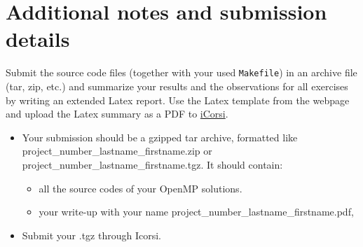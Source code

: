 \documentclass[unicode,11pt,a4paper,oneside,numbers=endperiod,openany]{scrartcl}
\begin{document}
\section*{Additional notes and submission details}
Submit the source code files (together with your used \texttt{Makefile}) in
an archive file (tar, zip, etc.) and summarize your results and the
observations for all exercises by writing an extended Latex report.
Use the Latex template from the webpage and upload the Latex summary
as a PDF to \href{https://www.icorsi.ch/course/view.php?id=14652}{iCorsi}.

\begin{itemize}
\item Your submission should be a gzipped tar archive, formatted like project\_number\_lastname\_firstname.zip or project\_number\_lastname\_firstname.tgz. 
      It should contain:
  \begin{itemize}
    \item all the source codes of your OpenMP solutions.
    \item your write-up with your name  project\_number\_lastname\_firstname.pdf, 
  \end{itemize}
   \item Submit your .tgz through Icorsi.
  \end{itemize}
\end{document}
